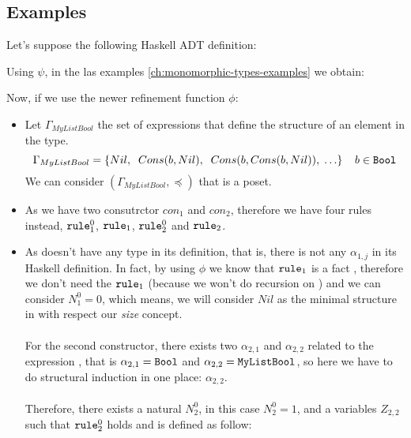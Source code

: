 	\subsection{Examples} \label{ch:monomorphic-bounded-types-examples}
	\begin{example}[MyListBool]
		Let's suppose the following Haskell ADT definition:
		
		Using $\psi$, in the las examples \ref{ch:monomorphic-types-examples} we obtain:
		
		Now, if we use the newer refinement function $\phi$:
		\begin{itemize}
			\item Let $\Gamma_{MyListBool}$ the set of expressions that define the structure of an element in the  type. $$\Gamma_{MyListBool} = \{ Nil, \;\; Cons(b, Nil), \;\; Cons(b, Cons(b, Nil)), \; \ldots \} \;\; \;\; b \in \texttt{Bool}$$
			      We can consider $(\Gamma_{MyListBool}, \preceq)$ that is a poset.
			\item As we have two consutrctor $con_1$ and $con_2$, therefore we have four rules instead, $\texttt{rule}_{1}^{0}$, $\texttt{rule}_1$, $\texttt{rule}_{2}^{0}$ and $\texttt{rule}_2$.
			\item As  doesn't have any type in its definition, that is, there is not any $\alpha_{1,j}$ in its Haskell definition. In fact, by using $\phi$ we know that $\texttt{rule}_1$ is a fact , therefore we don't need the $\texttt{rule}_1$ (because we won't do recursion on ) and we can consider $N_{1}^{0} = 0$, which means, we will consider $Nil$ as the minimal structure in  with respect our \textit{size} concept.\\\\
			      For the second constructor, there exists two $\alpha_{2,1}$ and $\alpha_{2,2}$ related to the expression , that is $\alpha_{2,1} = \texttt{Bool}$ and $\alpha_{2,2} = \texttt{MyListBool}$, so here we have to do structural induction in one place: $\alpha_{2,2}$.\\\\
			      Therefore, there exists a natural $N_{2}^{0}$, in this case $N_{2}^{0} = 1$, and a variables $Z_{2,2}$ such that $\texttt{rule}_{2}^{0}$ holds and is defined as follow:
			      \begin{flalign*}

\end{flalign*}
\end{itemize}
\end{example}
